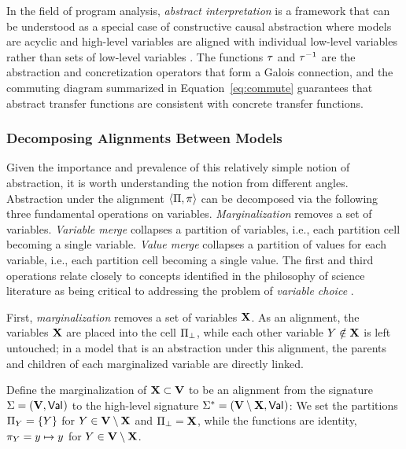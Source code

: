 \documentclass[twoside,11pt]{article}
\begin{document}
\begin{remark} In the field of program analysis, \textit{abstract interpretation} is a framework that can be understood as a special case of constructive causal abstraction where models are acyclic and high-level variables are aligned with individual low-level variables rather than sets of low-level variables \citep{CousotCousot77-1}. The functions $\tau$ and $\tau^{-1}$ are the abstraction and concretization operators that form a Galois connection, and the commuting diagram summarized in Equation~\ref{eq:commute} guarantees that abstract transfer functions are consistent with concrete transfer functions.
\end{remark}





\subsubsection{Decomposing Alignments Between Models} \label{section:decomposition}

Given the importance and prevalence of this relatively simple notion of abstraction, it is worth understanding the notion from different angles. Abstraction under the alignment $\langle \Pi, \pi \rangle$ can be decomposed via the following three fundamental operations on variables. \textit{Marginalization} removes a set of variables. \textit{Variable merge} collapses a partition of variables, i.e., each partition cell becoming a single variable. \textit{Value merge} collapses a partition of values for each variable, i.e., each partition cell becoming a single value. The first and third operations relate closely to concepts identified in the philosophy of science literature as being critical to addressing the problem of \emph{variable choice} \citep{Kinney,Woodward2021}. 

First, \emph{marginalization} removes a set of variables $\mathbf{X}$.
As an alignment, the variables $\mathbf{X}$ are placed into the cell $\Pi_\bot$, while each other variable $Y \notin \mathbf{X}$ is left untouched; in a model that is an abstraction under this alignment, the parents and children of each marginalized variable are directly linked.
\begin{definition}[Marginalization]
Define the marginalization of $\mathbf{X} \subset \mathbf{V}$ to be an alignment from the signature $\Sigma = (\mathbf{V}, \mathsf{Val}_{})$ to the high-level signature $\Sigma^* = (\mathbf{V} \setminus \mathbf{X}, \mathsf{Val}_{})$: We set the partitions $\Pi_{Y} = \{Y\}$ for $Y \in \mathbf{V} \setminus \mathbf{X}$ and $\Pi_\bot = \mathbf{X}$, while the functions are identity, $\pi_Y = y \mapsto y$ for $Y \in \mathbf{V} \setminus \mathbf{X}$. \label{def:marg}
\end{definition}
\end{document}
